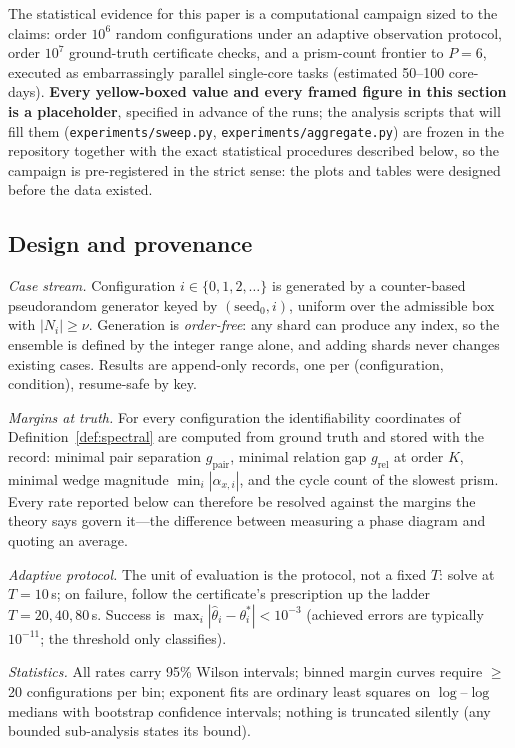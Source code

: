 \documentclass[twocolumn,preprintnumbers,amsmath,amssymb,pra,floatfix]{revtex4-2}
\begin{document}
The statistical evidence for this paper is a computational campaign
sized to the claims: order $10^{6}$ random configurations under an
adaptive observation protocol, order $10^{7}$ ground-truth certificate
checks, and a prism-count frontier to $P{=}6$, executed as
embarrassingly parallel single-core tasks (estimated 50--100
core-days).  \textbf{Every yellow-boxed value and every framed figure
in this section is a placeholder}, specified in advance of the runs;
the analysis scripts that will fill them
(\texttt{experiments/sweep.py}, \texttt{experiments/aggregate.py})
are frozen in the repository together with the exact statistical
procedures described below, so the campaign is pre-registered in the
strict sense: the plots and tables were designed before the data
existed.

\subsection{Design and provenance}
\label{sec:design}

\emph{Case stream.}  Configuration $i\in\{0,1,2,\dots\}$ is generated
by a counter-based pseudorandom generator keyed by
$(\mathrm{seed}_0,i)$, uniform over the admissible box with
$|N_i|\ge\nu$.  Generation is \emph{order-free}: any shard can produce
any index, so the ensemble is defined by the integer range alone, and
adding shards never changes existing cases.  Results are append-only
records, one per (configuration, condition), resume-safe by key.

\emph{Margins at truth.}  For every configuration the identifiability
coordinates of Definition~\ref{def:spectral} are computed from ground
truth and stored with the record: minimal pair separation
$g_{\mathrm{pair}}$, minimal relation gap $g_{\mathrm{rel}}$ at order
$K$, minimal wedge magnitude $\min_i|\alpha_{x,i}|$, and the cycle
count of the slowest prism.  Every rate reported below can therefore
be resolved against the margins the theory says govern it---the
difference between measuring a phase diagram and quoting an average.

\emph{Adaptive protocol.}  The unit of evaluation is the protocol,
not a fixed $T$: solve at $T{=}10$\,s; on failure, follow the
certificate's prescription up the ladder $T{=}20,40,80$\,s.  Success
is $\max_i|\hat\theta_i-\theta_i^{*}|<10^{-3}$ (achieved errors are
typically $10^{-11}$; the threshold only classifies).

\emph{Statistics.}  All rates carry 95\% Wilson intervals; binned
margin curves require $\ge$20 configurations per bin; exponent fits
are ordinary least squares on $\log$--$\log$ medians with bootstrap
confidence intervals; nothing is truncated silently (any bounded
sub-analysis states its bound).
\end{document}
